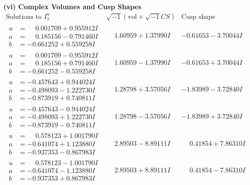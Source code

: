 \documentclass[1p]{elsarticle_modified}
\theoremstyle{definition}
\newcommand{\I}{\sqrt{-1}}
\begin{document}
\newpage\flushleft \textbf{(vi) Complex Volumes and Cusp Shapes}
$$\begin{array}{c|c|c}  
\text{Solutions to }I^u_{1}& \I (\text{vol} + \sqrt{-1}CS) & \text{Cusp shape}\\
 \hline 
\begin{aligned}
u &= \phantom{-}0.001709 + 0.955912 I \\
a &= \phantom{-}0.185156 - 0.791460 I \\
b &= -0.661252 + 0.559258 I\end{aligned}
 & \phantom{-}1.60959 + 1.37990 I & -0.61653 - 3.70044 I \\ \hline\begin{aligned}
u &= \phantom{-}0.001709 - 0.955912 I \\
a &= \phantom{-}0.185156 + 0.791460 I \\
b &= -0.661252 - 0.559258 I\end{aligned}
 & \phantom{-}1.60959 - 1.37990 I & -0.61653 + 3.70044 I \\ \hline\begin{aligned}
u &= -0.457643 + 0.944024 I \\
a &= -0.498093 - 1.222730 I \\
b &= -0.873919 + 0.740811 I\end{aligned}
 & \phantom{-}1.28798 + 3.57056 I & -1.83989 - 3.72840 I \\ \hline\begin{aligned}
u &= -0.457643 - 0.944024 I \\
a &= -0.498093 + 1.222730 I \\
b &= -0.873919 - 0.740811 I\end{aligned}
 & \phantom{-}1.28798 - 3.57056 I & -1.83989 + 3.72840 I \\ \hline\begin{aligned}
u &= \phantom{-}0.578123 + 1.001790 I \\
a &= -0.641074 + 1.123880 I \\
b &= -0.937353 - 0.867983 I\end{aligned}
 & \phantom{-}2.89503 - 8.89111 I & \phantom{-}0.41854 + 7.86310 I \\ \hline\begin{aligned}
u &= \phantom{-}0.578123 - 1.001790 I \\
a &= -0.641074 - 1.123880 I \\
b &= -0.937353 + 0.867983 I\end{aligned}
 & \phantom{-}2.89503 + 8.89111 I & \phantom{-}0.41854 - 7.86310 I \\ \hline\begin{aligned}

\end{aligned}
\end{array}$$
\end{document}
